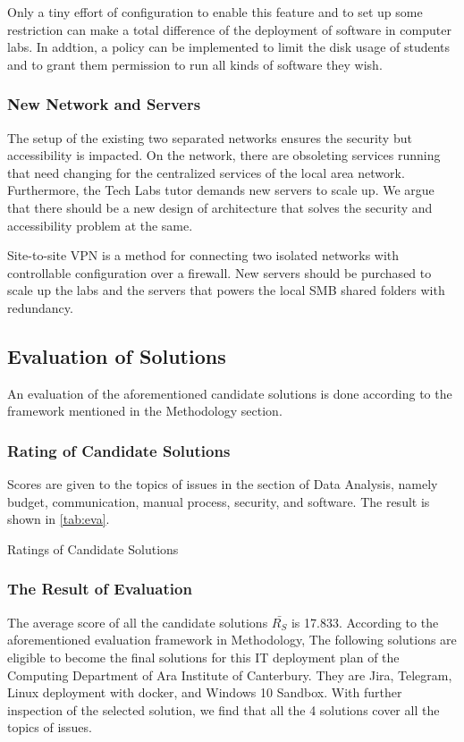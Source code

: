 Only a tiny effort of configuration to enable this feature and to set up some restriction can make a total difference of the deployment of software in computer labs. In addtion, a policy can be implemented to limit the disk usage of students and to grant them permission to run all kinds of software they wish.

\subsubsection{New Network and Servers}
The setup of the existing two separated networks ensures the security but accessibility is impacted. On the network, there are obsoleting services running that need changing for the centralized services of the local area network. Furthermore, the Tech Labs tutor demands new servers to scale up. We argue that there should be a new design of architecture that solves the security and accessibility problem at the same.

Site-to-site VPN is a method for connecting two isolated networks with controllable configuration over a firewall. New servers should be purchased to scale up the labs and the servers that powers the local SMB shared folders with redundancy.

\subsection{Evaluation of Solutions}
An evaluation of the aforementioned candidate solutions is done according to the framework mentioned in the Methodology section.

\subsubsection{Rating of Candidate Solutions}

Scores are given to the topics of issues in the section of Data Analysis, namely budget, communication, manual process, security, and software. The result is shown in \autoref{tab:eva}.

\begin{table}[!ht]
\caption{Ratings of Candidate Solutions}
\begin{adjustbox}{width=1\textwidth}
\end{adjustbox}
\label{tab:eva}
\end{table}

\subsubsection{The Result of Evaluation}
The average score of all the candidate solutions $\bar{R_{S}}$ is 17.833. According to the aforementioned evaluation framework in Methodology, The following solutions are eligible to become the final solutions for this IT deployment plan of the Computing Department of Ara Institute of Canterbury. They are Jira, Telegram, Linux deployment with docker, and Windows 10 Sandbox. With further inspection of the selected solution, we find that all the 4 solutions cover all the topics of issues.


